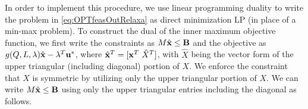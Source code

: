 
In order to implement this procedure, we use linear programming duality to write the problem in \cref{eq:OPTfeasOutRelaxa} as direct minimization LP (in place of a min-max problem).
To construct the dual of the inner maximum objective function, we first write the constraints as $M\hat{\mathbf{x}} \leq \mathbf{B}$ and the objective as $g(Q,L,\lambda)\hat{\mathbf{x}}-\lambda^T\mathbf{u}^*$, where $\hat{\mathbf{x}}^T=[\mathbf{x}^T ~\hat{X}^T]$, with $\hat{X}$ being the vector form of the upper triangular (including diagonal) portion of $X$. 
We enforce the constraint that $X$ is symmetric by utilizing only the upper triangular portion of $X$.
We can write $M \hat{\mathbf{x}} \leq \mathbf{B}$ using only the upper triangular entries including the diagonal as follows.

